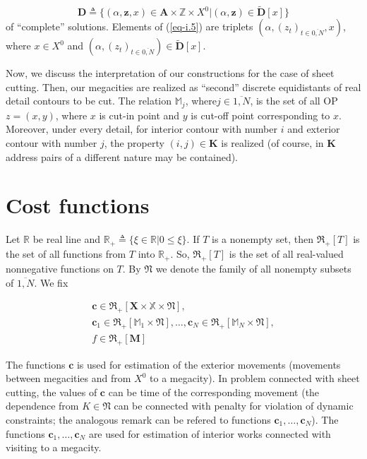 \documentclass{article}
\begin{document}
\begin{equation}
  \label{eq-i.5}
  \mathbf D \triangleq
  \{
    (\alpha,\mathbf z, x) \in \mathbf A \times \mathbb Z \times X^0
  |
    (\alpha,\mathbf z) \in \tilde {\mathbf D}[x]
  \}
\end{equation}
of ``complete'' solutions.
Elements of (\ref{eq-i.5})
are triplets
$(\alpha,(z_t)_{t \in \overline{0,N}}, x)$,
where
$x \in X^0$
and
$(\alpha,(z_t)_{t \in \overline{0,N}}) \in \tilde {\mathbf D}[x]$.

Now, we discuss the interpretation of our constructions
for the case of sheet cutting.
Then, our megacities are realized as ``second''
discrete equidistants of real detail contours to be cut.
The relation
$\mathbb M_j$,
where$j \in \overline{1,N}$,
is the set of all OP
$z=(x,y)$,
where
$x$ is cut-in point and
$y$ is cut-off point corresponding to $x$.
Moreover,
under every detail,
for interior contour with number $i$
and exterior contour with number $j$,
the property
$(i,j) \in \mathbf K$
is realized
(of course, in $\mathbf K$
address pairs of a different nature
may be contained).

\section*{Cost functions}

Let
$\mathbb R$
be real line and
$\mathbb R_+ \triangleq \{ \xi \in \mathbb R | 0 \leqslant \xi\}$.
If $T$ is a nonempty set,
then
$\mathfrak R_+[T]$
is the set of all functions from $T$
into $\mathbb R_+$.
So,
$\mathfrak R_+[T]$
is the set of all real-valued nonnegative functions on $T$.
By
$\mathfrak N$
we denote the family of all nonempty subsets of
$\overline{1,N}$.
We fix

\begin{multline}
  \label{eq-i.6}
\mathbf c \in \mathfrak R_+[\mathbf X \times \mathbb X \times \mathfrak N], \\
\mathbf c_1 \in \mathfrak R_+[\mathbb M_1 \times \mathfrak N],
\dots ,
\mathbf c_N \in \mathfrak R_+[\mathbb M_N \times \mathfrak N], \\
f \in \mathfrak R_+[\mathbf M]
\end{multline}

The functions
$\mathbf c$
is used for estimation of the exterior movements
(movements between megacities and from $X^0$ to a megacity).
In problem connected with sheet cutting,
the values of
$\mathbf c$
can be time of the corresponding movement
(the dependence from
$K \in \mathfrak N$
can be connected with penalty for violation of dynamic constraints;
the analogous remark can be refered to functions
$\mathbf c_1, \dots, \mathbf c_N$).
The functions
$\mathbf c_1, \dots, \mathbf c_N$
are used for estimation of interior works
connected with visiting to a megacity.
\end{document}
